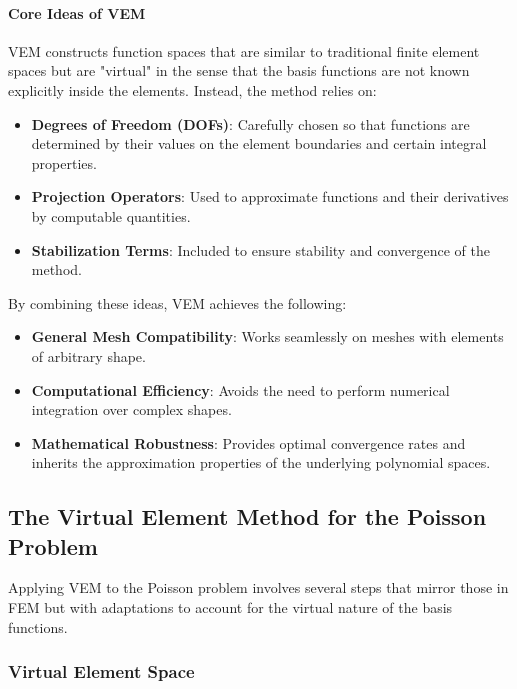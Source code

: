 \documentclass[class=article, crop=false]{standalone}
\begin{document}
\paragraph{Core Ideas of VEM}

VEM constructs function spaces that are similar to traditional finite element spaces but are "virtual" in the sense that the basis functions are not known explicitly inside the elements. Instead, the method relies on:

\begin{itemize}
    \item \textbf{Degrees of Freedom (DOFs)}: Carefully chosen so that functions are determined by their values on the element boundaries and certain integral properties.
    \item \textbf{Projection Operators}: Used to approximate functions and their derivatives by computable quantities.
    \item \textbf{Stabilization Terms}: Included to ensure stability and convergence of the method.
\end{itemize}

By combining these ideas, VEM achieves the following:

\begin{itemize}
    \item \textbf{General Mesh Compatibility}: Works seamlessly on meshes with elements of arbitrary shape.
    \item \textbf{Computational Efficiency}: Avoids the need to perform numerical integration over complex shapes.
    \item \textbf{Mathematical Robustness}: Provides optimal convergence rates and inherits the approximation properties of the underlying polynomial spaces.
\end{itemize}

\subsection{The Virtual Element Method for the Poisson Problem}

Applying VEM to the Poisson problem involves several steps that mirror those in FEM but with adaptations to account for the virtual nature of the basis functions.

\subsubsection{Virtual Element Space}
\end{document}
